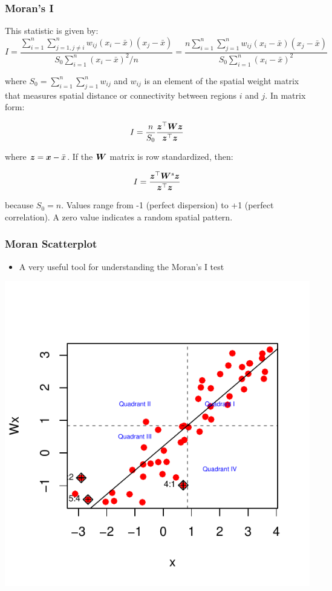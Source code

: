 \documentclass[english,10pt]{beamer}\usepackage[]{graphicx}\usepackage[]{xcolor}
\newenvironment{knitrout}{}{} %
\begin{document}
\begin{frame}
  \frametitle{Moran's I}
    This statistic is given by:
      \begin{equation}
I = \frac{\sum_{i = 1}^n\sum_{j=1, j\neq i}^n w_{ij}\left(x_i - \bar{x}\right)\left(x_j - \bar{x}\right)}{S_0 \sum_{i = 1}^n\left(x_i - \bar{x}\right)^2/n} = \frac{n\sum_{i = 1}^n\sum_{j=1}^n w_{ij}\left(x_i - \bar{x}\right)\left(x_j - \bar{x}\right)}{S_0 \sum_{i = 1}^n\left(x_i - \bar{x}\right)^2}
\end{equation}

where $S_0=\sum_{i = 1}^n\sum_{j=1}^nw_{ij}$ and $w_{ij}$ is an element of the spatial weight matrix that measures spatial distance or connectivity between regions $i$ and $j$. In matrix form:


\begin{equation}
	I = \frac{n}{S_0} \frac{\bm z^\top\bm W\bm z}{\bm z^\top\bm z}
\end{equation}

where $\bm z = \bm x - \bar{x}$. If the $\bm W$ matrix is row standardized, then:

\begin{equation}
	I = \frac{\bm z^\top\bm W^s\bm z}{\bm z^\top\bm z}
\end{equation}

because $S_0=n$. Values range from -1 (perfect dispersion) to +1 (perfect correlation). A zero value indicates a random spatial pattern.
\end{frame}

\begin{frame}
  \frametitle{Moran Scatterplot}
    \begin{itemize}
      \item A very useful tool for understanding the Moran's I test
    \end{itemize}
    

\begin{knitrout}
\color{fgcolor}

{\centering \includegraphics[width=0.7\linewidth]{figure/moran-1} 

}


\end{knitrout}

\end{frame}
\end{document}
